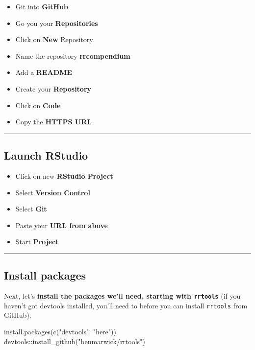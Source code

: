 \documentclass[
  letterpaper,
  DIV=11,
  numbers=noendperiod]{scrreprt}
\newenvironment{Shaded}{\begin{snugshade}}{\end{snugshade}}
\newcommand{\FunctionTok}[1]{\textcolor[rgb]{0.28,0.35,0.67}{#1}}
\newcommand{\NormalTok}[1]{\textcolor[rgb]{0.00,0.23,0.31}{#1}}
\newcommand{\SpecialCharTok}[1]{\textcolor[rgb]{0.37,0.37,0.37}{#1}}
\newcommand{\StringTok}[1]{\textcolor[rgb]{0.13,0.47,0.30}{#1}}
\begin{document}
\begin{itemize}
\item
  Git into \textbf{GitHub}
\item
  Go you your \textbf{Repositories}
\item
  Click on \textbf{New} Repository
\item
  Name the repository \textbf{rrcompendium}
\item
  Add a \textbf{README}
\item
  Create your \textbf{Repository}
\item
  Click on \textbf{Code}
\item
  Copy the \textbf{HTTPS URL}
\end{itemize}

\begin{center}\rule{0.5\linewidth}{0.5pt}\end{center}

\hypertarget{launch-rstudio}{%
\subsection{Launch RStudio}\label{launch-rstudio}}

\begin{itemize}
\item
  Click on new \textbf{RStudio Project}
\item
  Select \textbf{Version Control}
\item
  Select \textbf{Git}
\item
  Paste your \textbf{URL from above}
\item
  Start \textbf{Project}
\end{itemize}

\begin{center}\rule{0.5\linewidth}{0.5pt}\end{center}

\hypertarget{install-packages}{%
\subsection{Install packages}\label{install-packages}}

Next, let's \textbf{install the packages we'll need, starting with
\texttt{rrtools}} (if you haven't got devtools installed, you'll need to
before you can install \texttt{rrtools} from GitHub).

\begin{Shaded}
\begin{Highlighting}[]
\FunctionTok{install.packages}\NormalTok{(}\FunctionTok{c}\NormalTok{(}\StringTok{"devtools"}\NormalTok{,}
                   \StringTok{"here"}\NormalTok{)) }
\NormalTok{devtools}\SpecialCharTok{::}\FunctionTok{install\_github}\NormalTok{(}\StringTok{"benmarwick/rrtools"}\NormalTok{)}
\end{Highlighting}
\end{Shaded}
\end{document}

